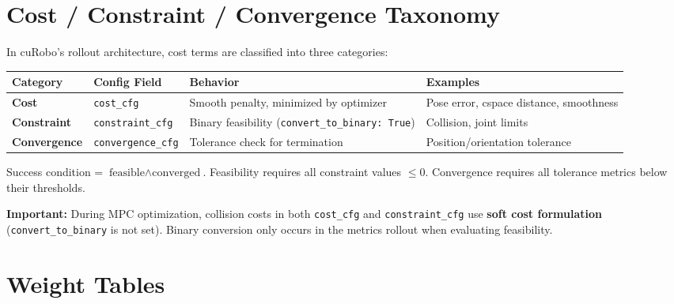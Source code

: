 \documentclass[11pt,a4paper]{article}
\begin{document}
\section{Cost / Constraint / Convergence Taxonomy}

In cuRobo's rollout architecture, cost terms are classified into three categories:

\begin{center}
\begin{tabular}{@{}llll@{}}
\toprule
Category & Config Field & Behavior & Examples \\
\midrule
\textbf{Cost}       & \texttt{cost\_cfg}       & Smooth penalty, minimized by optimizer & Pose error, cspace distance, smoothness \\
\textbf{Constraint} & \texttt{constraint\_cfg} & Binary feasibility (\texttt{convert\_to\_binary: True}) & Collision, joint limits \\
\textbf{Convergence}& \texttt{convergence\_cfg} & Tolerance check for termination & Position/orientation tolerance \\
\bottomrule
\end{tabular}
\end{center}

Success condition = $\text{feasible} \land \text{converged}$.
Feasibility requires all constraint values $\le 0$.
Convergence requires all tolerance metrics below their thresholds.

\textbf{Important:} During MPC optimization, collision costs in both \texttt{cost\_cfg}
and \texttt{constraint\_cfg} use \textbf{soft cost formulation}
(\texttt{convert\_to\_binary} is not set). Binary conversion only occurs in the
metrics rollout when evaluating feasibility.

\section{Weight Tables}
\end{document}
